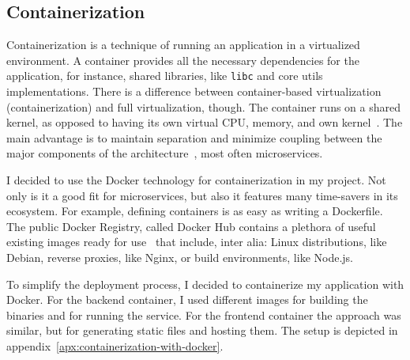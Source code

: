 \subsection{Containerization}\label{sec:containerization}

Containerization is a technique of running an application
in a virtualized environment.
A container provides all the necessary dependencies
for the application,
for instance, shared libraries,
like \texttt{libc} and core utils implementations.
There is a difference between container-based virtualization
(containerization) and full virtualization, though.
The container runs on a shared kernel,
as opposed to having its own
virtual CPU, memory, and own kernel~\cite{watada_emerging_2019}.
The main advantage is to maintain separation
and minimize coupling between
the major components of the architecture~\cite{stytz_rapid_1997},
most often microservices.

I decided to use the Docker technology
for containerization in my project.
Not only is it a good fit for microservices,
but also it features many time-savers in its ecosystem.
For example,
defining containers
is as easy as writing a Dockerfile.
The public Docker Registry,
called Docker Hub contains a plethora
of useful existing images ready for use~\cite{jaramillo_leveraging_2016}
that include, inter alia:
Linux distributions, like Debian,
reverse proxies, like Nginx,
or build environments, like Node.js.

To simplify the deployment process,
I decided to containerize my application
with Docker.
For the backend container,
I used different images
for building the binaries
and for running the service.
For the frontend container the approach was similar,
but for generating static files
and hosting them.
The setup is depicted in appendix~\ref{apx:containerization-with-docker}.
